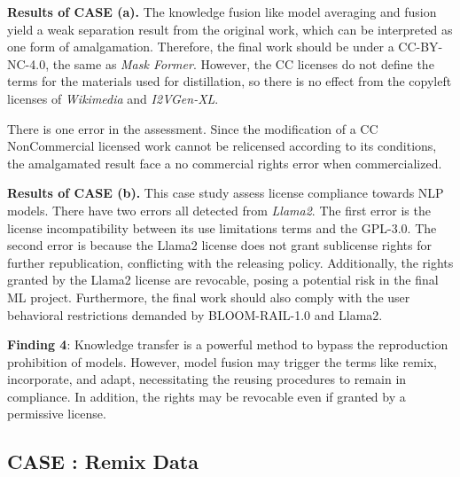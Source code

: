 \textbf{Results of CASE  (a).}
The knowledge fusion like model averaging and fusion yield a weak separation result from the original work, which can be interpreted as one form of amalgamation.
Therefore, the final work should be under a CC-BY-NC-4.0, the same as \textit{Mask Former}.
However, the CC licenses do not define the terms for the materials used for distillation, so there is no effect from the copyleft licenses of \textit{Wikimedia} and \textit{I2VGen-XL}.
 
There is one error in the assessment. 
Since the modification of a CC NonCommercial licensed work cannot be relicensed according to its conditions, the amalgamated result face a no commercial rights error when commercialized.

\textbf{Results of CASE  (b).}
This case study assess license compliance towards NLP models.
There have two errors all detected from \textit{Llama2}.
The first error is the license incompatibility between its use limitations terms and the GPL-3.0.
The second error is because the Llama2 license does not grant sublicense rights for further republication, conflicting with the releasing policy.
Additionally, the rights granted by the Llama2 license are revocable, posing a potential risk in the final ML project.
Furthermore, the final work should also comply with the user behavioral restrictions demanded by BLOOM-RAIL-1.0 and Llama2.

\begin{tcolorbox}
\textbf{Finding 4}: Knowledge transfer is a powerful method to bypass the reproduction prohibition of models. 
However, model fusion may trigger the terms like remix, incorporate, and adapt, necessitating the reusing procedures to remain in compliance.
In addition, the rights may be revocable even if granted by a permissive license.
\end{tcolorbox}

\subsection{CASE  : Remix Data}

